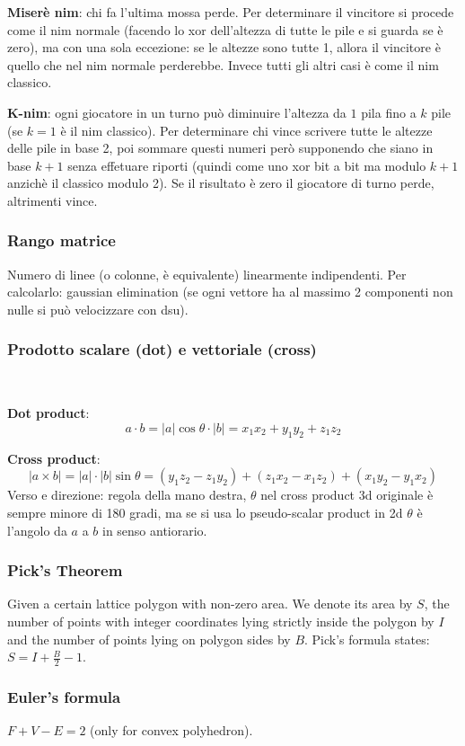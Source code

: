 \textbf{Miserè nim}: chi fa l'ultima mossa perde. Per determinare il vincitore si procede come il nim normale (facendo lo xor dell'altezza di tutte le pile e si guarda se è zero), ma con una sola eccezione: se le altezze sono tutte 1, allora il vincitore è quello che nel nim normale perderebbe. Invece tutti gli altri casi è come il nim classico.

\textbf{K-nim}: ogni giocatore in un turno può diminuire l'altezza da $1$ pila fino a $k$ pile (se $k=1$ è il nim classico). Per determinare chi vince scrivere tutte le altezze delle pile in base 2, poi sommare questi numeri però supponendo che siano in base $k+1$ senza effetuare riporti (quindi come uno xor bit a bit ma modulo $k+1$ anzichè il classico modulo 2). Se il risultato è zero il giocatore di turno perde, altrimenti vince.

\subsubsection{Rango matrice}
Numero di linee (o colonne, è equivalente) linearmente indipendenti. Per calcolarlo: gaussian elimination (se ogni vettore ha al massimo 2 componenti non nulle si può velocizzare con dsu).

\subsubsection{Prodotto scalare (dot) e vettoriale (cross)} 
\,

\textbf{Dot product}: 
$$a\cdot b = |a| \cos \theta \cdot |b| = x_1 x_2 + y_1 y_2 + z_1 z_2$$

\textbf{Cross product}:  
$$|a\times b| = |a| \cdot |b| \sin \theta = (y_1 z_2 - z_1 y_2) + (z_1 x_2 - x_1 z_2) + (x_1 y_2 - y_1 x_2)$$ 
Verso e direzione: regola della mano destra, $\theta$ nel cross product 3d originale è sempre minore di 180 gradi, ma se si usa lo pseudo-scalar product in 2d $\theta$ è l'angolo da $a$ a $b$ in senso antiorario.

\subsubsection{Pick's Theorem}
Given a certain lattice polygon with non-zero area.
We denote its area by $S$, the number of points with integer coordinates lying strictly inside the polygon by $I$ and the number of points lying on polygon sides by $B$.
Pick's formula states: $S=I+\frac{B}{2}-1$.

\subsubsection{Euler's formula} $F+V-E=2$ (only for convex polyhedron).


